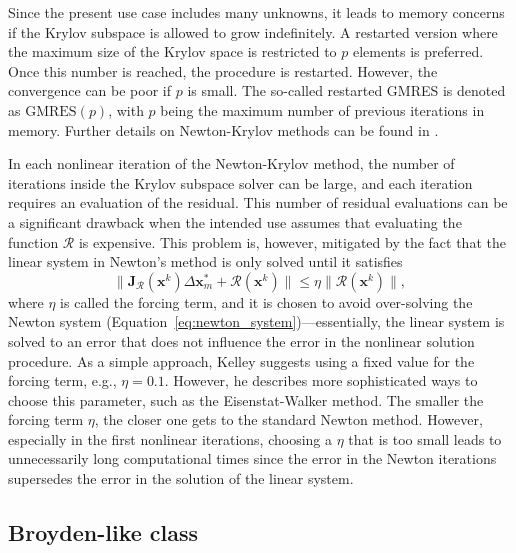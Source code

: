           Since the present use case includes many unknowns, it leads to memory concerns if the Krylov subspace is allowed to grow indefinitely.
          A restarted version where the maximum size of the Krylov space is restricted to \(p\) elements is preferred.
          Once this number is reached, the procedure is restarted.
          However, the convergence can be poor if \(p\) is small.
          The so-called restarted GMRES is denoted as \(\text{GMRES}(p)\), with \(p\) being the maximum number of previous iterations in memory.
          Further details on Newton-Krylov methods can be found in \cite{kelley_solving_2003}.

          In each nonlinear iteration of the Newton-Krylov method, the number of iterations inside the Krylov subspace solver can be large, and each iteration requires an evaluation of the residual.
          This number of residual evaluations can be a significant drawback when the intended use assumes that evaluating the function \(\bm{\mathcal{R}}\) is expensive.
          This problem is, however, mitigated by the fact that the linear system in Newton's method is only solved until it satisfies
          \begin{equation}
            \|\bm{\mathbf{J}}_{\bm{\mathcal{R}}}(\mathbf{x}^k) \Delta \mathbf{x}^*_m+ \bm{\mathcal{R}}(\mathbf{x}^k)\| \leq \eta\|\bm{\mathcal{R}}(\mathbf{x}^k)\|,
          \end{equation}
          where \(\eta\) is called the forcing term, and it is chosen to avoid over-solving the Newton system (Equation~\eqref{eq:newton_system})---essentially, the linear system is solved to an error that does not influence the error in the nonlinear solution procedure.
          As a simple approach, Kelley \citep{kelley_solving_2003} suggests using a fixed value for the forcing term, e.g., \(\eta=0.1\).
          However, he describes more sophisticated ways to choose this parameter, such as the Eisenstat-Walker method.
          The smaller the forcing term \(\eta\), the closer one gets to the standard Newton method.
          However, especially in the first nonlinear iterations, choosing a \(\eta\) that is too small leads to unnecessarily long computational times since the error in the Newton iterations supersedes the error in the solution of the linear system.

          \subsection{Broyden-like class} \label{sec:multisecant}


